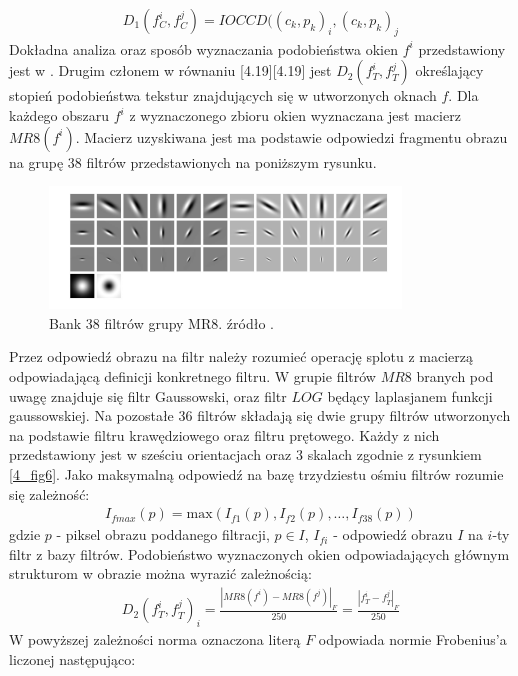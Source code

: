 \documentclass[12pt, twoside, openany]{report}
\theoremstyle{definition}
\begin{document}
\begin{align}
D_1\left(f^i_C,f^j_C\right)=IOCCD({\left(c_k,p_k\right)}_i,{\left(c_k,p_k\right)}_j
\end{align}
Dokładna analiza oraz sposób wyznaczania podobieństwa okien $f^i$ przedstawiony jest w \cite{chen2005adaptive}. 
 Drugim członem w równaniu [4.19][4.19] jest $D_2\left(f^i_T,f^j_T\right)$ określający stopień podobieństwa tekstur znajdujących się w utworzonych oknach $f$. Dla każdego obszaru $f^i$ z wyznaczonego zbioru okien wyznaczana jest macierz $MR8(f^i)$. Macierz uzyskiwana jest ma podstawie odpowiedzi fragmentu obrazu na grupę 38 filtrów przedstawionych na poniższym rysunku.
\begin{figure}[!h]
	\centering
	\includegraphics[scale=1]{rysunki/4_fig6}
	\caption{Bank 38 filtrów grupy MR8. źródło \cite{varma2009statistical}.}
\label{4_fig6}
\end{figure}
Przez odpowiedź obrazu na filtr należy rozumieć operację splotu z macierzą odpowiadającą definicji konkretnego filtru. W grupie filtrów $MR8$ branych pod uwagę znajduje się filtr Gaussowski, oraz filtr $LOG$ będący laplasjanem funkcji gaussowskiej. Na pozostałe 36 filtrów składają się dwie grupy filtrów utworzonych na podstawie filtru krawędziowego oraz filtru prętowego. Każdy z nich przedstawiony jest w sześciu orientacjach oraz 3 skalach zgodnie z rysunkiem \autoref{4_fig6}. Jako maksymalną odpowiedź na bazę trzydziestu ośmiu filtrów rozumie się zależność:
\begin{align}
I_{fmax}(p)=\mathrm{max}\mathrm{}(I_{f1}(p),I_{f2}(p),\dots ,I_{f38}(p))
\end{align}
gdzie $p$ - piksel obrazu poddanego filtracji, $p\in I$, $I_{fi}$ - odpowiedź obrazu $I$ na $i$-ty filtr z bazy filtrów. Podobieństwo wyznaczonych okien odpowiadających głównym strukturom w obrazie można wyrazić zależnością:
\begin{align}
D_2{\left(f^i_T,f^j_T\right)}_i=\frac{{\left|MR8\left(f^i\right)-MR8\left(f^j\right)\right|}_F}{250}=\frac{{\left|f^i_T-f^j_T\right|}_F}{250}
\end{align}
W powyższej zależności norma oznaczona literą $F$ odpowiada normie Frobenius'a liczonej następująco:
\end{document}
